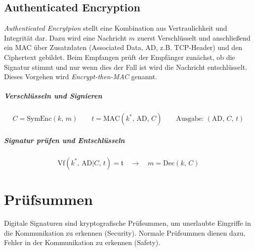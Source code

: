 \documentclass[a4paper, 11pt, accentcolor = tud3b]{tudreport}
\newcommand{\Dec}{\ensuremath{\textrm{Dec}}}
\newcommand{\Vf}{\ensuremath{\textrm{Vf}}}
\newcommand{\MAC}{\ensuremath{\textrm{MAC}}}
\begin{document}

            \subsection{Authenticated Encryption}
                \textit{Authenticated Encrytpion} stellt eine Kombination aus Vertraulichkeit und Integrität dar. Dazu wird eine Nachricht \(m\) zuerst Verschlüsselt und anschließend ein MAC über Zusatzdaten (Associated Data, AD, z.B. TCP-Header) und den Ciphertext gebildet. Beim Empfangen prüft der Empfänger zunächst, ob die Signatur stimmt und nur wenn dies der Fall ist wird die Nachricht entschlüsselt. Dieses Vorgehen wird \textit{Encrypt-then-MAC} genannt.
                
	            \subparagraph{Verschlüsseln und Signieren}
                \begin{equation*}
	                C = \text{SymEnc}(k,\, m) \qquad t = \MAC(k^*,\, \textrm{AD},\, C) \qquad \textrm{Ausgabe: } (\textrm{AD},\, C,\, t)
                \end{equation*}
                
                \subparagraph{Signatur prüfen und Entschlüsseln}
                \begin{equation*}
	                \Vf(k^*,\, \textrm{AD} \vert C,\, t) = \mathfrak{t} \quad\rightarrow\quad m = \Dec(k,\, C)
                \end{equation*}

        \section{Prüfsummen}
            Digitale Signaturen sind kryptografische Prüfsummen, um unerlaubte Eingriffe in die Kommunikation zu erkennen (Security). Normale Prüfsummen dienen dazu, Fehler in der Kommunikation zu erkennen (Safety).
\end{document}
